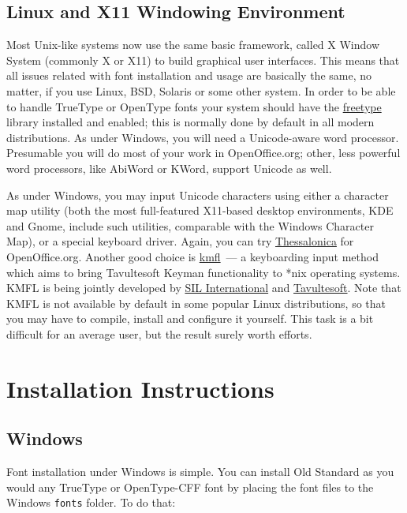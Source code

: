 \documentclass[12pt,a4paper,openany]{book}
\begin{document}
\subsection{Linux and X11 Windowing Environment}

Most Unix-like systems now use the same basic framework, called X Window
System (commonly X or X11) to build graphical user interfaces. This means
that all issues related with font installation and usage are basically the
same, no matter, if you use Linux, BSD, Solaris or some other system. In
order to be able to handle TrueType or OpenType fonts your system should
have the \href{http://freetype.sourceforge.net}{freetype} library installed
and enabled; this is normally done by default in all modern distributions.
As under Windows, you will need a Unicode-aware word processor. Presumable
you will do most of your work in OpenOffice.org; other, less powerful word
processors, like AbiWord or KWord, support Unicode as well.

As under Windows, you may input Unicode characters using either a character
map utility (both the most full-featured X11-based desktop environments,
KDE and Gnome, include such utilities, comparable with the Windows
Character Map), or a special keyboard driver. Again, you can try
\href{http://www.thessalonica.org.ru}{Thessalonica} for OpenOffice.org.
Another good choice is \href{href://kmfl.sourceforge.net}{kmfl}~— a
keyboarding input method which aims to bring Tavultesoft Keyman
functionality to *nix operating systems. KMFL is being jointly developed by
\href{http://www.sil.org}{SIL International} and
\href{http://www.tavultesoft.com}{Tavultesoft}. Note that KMFL is not
available by default in some popular Linux distributions, so that
you may have to compile, install and configure it yourself. This task
is a bit difficult for an average user, but the result surely worth
efforts.

\section{Installation Instructions}

\subsection{Windows}

Font installation under Windows is simple. You can install Old Standard as
you would any TrueType or OpenType-CFF font by placing the font files to
the Windows \texttt{fonts} folder. To do that:
\end{document}
